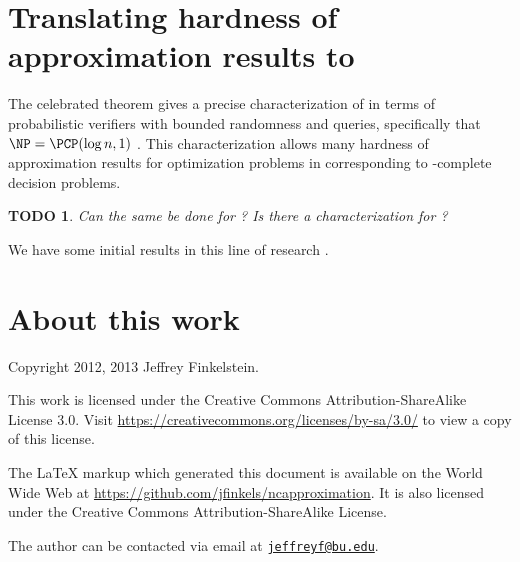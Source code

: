\documentclass[]{article}
\theoremstyle{plain}
\newtheorem{todo}{TODO}
\theoremstyle{definition}
\newcommand{\email}[1]{\href{mailto:#1}{\nolinkurl{#1}}}
\begin{document}
\section{Translating hardness of approximation results to \texorpdfstring{\NC}{NC}}

The celebrated \PCP{} theorem gives a precise characterization of \NP{} in terms of probabilistic verifiers with bounded randomness and queries, specifically that $\NP = \PCP(\log n, 1)$ \cite{pcp}.
This characterization allows many hardness of approximation results for optimization problems in \NPO{} corresponding to \NP-complete decision problems.

\begin{todo}
  Can the same be done for \NNC?
  Is there a \PCP{} characterization for \NNC?
\end{todo}

We have some initial results in this line of research \cite{finkelstein13}.

\section{About this work}

Copyright 2012, 2013 Jef{}frey Finkelstein.

This work is licensed under the Creative Commons Attribution-ShareAlike License 3.0.
Visit \mbox{\url{https://creativecommons.org/licenses/by-sa/3.0/}} to view a copy of this license.

The \LaTeX{} markup which generated this document is available on the World Wide Web at \mbox{\url{https://github.com/jfinkels/ncapproximation}}.
It is also licensed under the Creative Commons Attribution-ShareAlike License.

The author can be contacted via email at \email{jeffreyf@bu.edu}.



\end{document}
